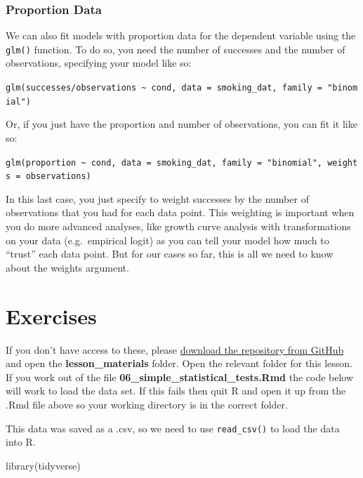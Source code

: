 \documentclass[
]{book}
\newenvironment{Shaded}{\begin{snugshade}}{\end{snugshade}}
\newcommand{\FunctionTok}[1]{\textcolor[rgb]{0.00,0.00,0.00}{#1}}
\newcommand{\NormalTok}[1]{#1}
\begin{document}
\hypertarget{proportion-data}{%
\subsubsection{Proportion Data}\label{proportion-data}}

We can also fit models with proportion data for the dependent variable using the \texttt{glm()} function. To do so, you need the number of successes and the number of observations, specifying your model like so:

\texttt{glm(successes/observations\ \textasciitilde{}\ cond,\ data\ =\ smoking\_dat,\ family\ =\ "binomial")}

Or, if you just have the proportion and number of observations, you can fit it like so:

\texttt{glm(proportion\ \textasciitilde{}\ cond,\ data\ =\ smoking\_dat,\ family\ =\ "binomial",\ weights\ =\ observations)}

In this last case, you just specify to weight successes by the number of observations that you had for each data point. This weighting is important when you do more advanced analyses, like growth curve analysis with transformations on your data (e.g.~empirical logit) as you can tell your model how much to ``trust'' each data point. But for our cases so far, this is all we need to know about the weights argument.

\hypertarget{exercises-5}{%
\section{Exercises}\label{exercises-5}}

If you don't have access to these, please \href{https://github.com/gpwilliams/r4psych}{download the repository from GitHub} and open the \textbf{lesson\_materials} folder. Open the relevant folder for this lesson. If you work out of the file \textbf{06\_simple\_statistical\_tests.Rmd} the code below will work to load the data set. If this fails then quit R and open it up from the .Rmd file above so your working directory is in the correct folder.

This data was saved as a .csv, so we need to use \texttt{read\_csv()} to load the data into R.

\begin{Shaded}
\begin{Highlighting}[]
\FunctionTok{library}\NormalTok{(tidyverse)}
\end{Highlighting}
\end{Shaded}
\end{document}
